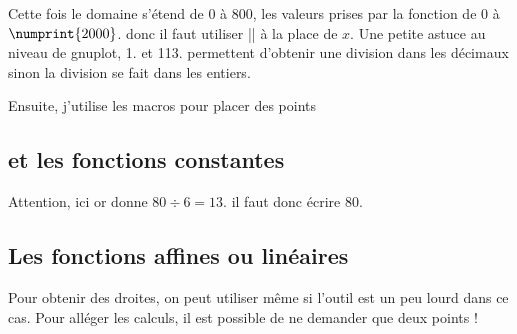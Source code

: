 Cette fois le domaine s'étend de 0 à 800, les valeurs prises par la fonction de $0$ à $\numprint{2000}$.  donc il faut utiliser |\x| à la place de $x$. Une petite astuce au niveau de gnuplot, 1. et 113. permettent d'obtenir une division dans les décimaux sinon la division se fait dans les entiers.

Ensuite, j'utilise les macros pour placer des points
\begin{tkzexample}[vbox]
\end{tkzexample}

\subsection{ et les fonctions constantes}

Attention, ici   or  donne $80\div 6=13$. il faut donc écrire $80.$

\begin{tkzexample}[vbox]
\end{tkzexample}

\subsection{Les fonctions affines ou linéaires}
Pour obtenir des droites, on peut utiliser  même si l'outil est un peu lourd dans ce cas. Pour alléger les calculs, il est possible de ne demander que deux points !

\begin{tkzexample}[vbox]
\end{tkzexample}
